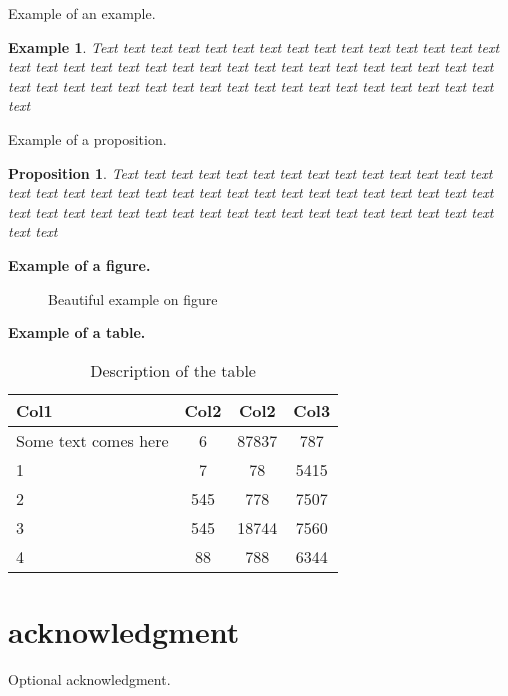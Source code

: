 \documentclass[12pt]{amsart}
\newtheorem{example}{Example}
\newtheorem{proposition}{Proposition}
\numberwithin{equation}{section}
\numberwithin{definition}{section}
\numberwithin{theorem}{section}
\numberwithin{lemma}{section}
\numberwithin{remark}{section}
\numberwithin{corollary}{section}
\numberwithin{proposition}{section}
\numberwithin{equation}{section}
\begin{document}
Example of an example.

\begin{example}\label{ex-1}
Text text text text text text text text text text text text text text text text text text text text text text text text text text text text text text text text text text text text text text text text text text text text text text text text text text text text
\end{example}


Example of a proposition.

\begin{proposition}\label{prop-1}
Text text text text text text text text text text text text text text text text text text text text text text text text text text text text text text text text text text text text text text text text text text text text text text text text text text text text
\end{proposition}

\textbf{Example of a figure.}
\begin{figure}[h!]
\centering
\caption{Beautiful example on figure}\label{fig-1}
\end{figure}


\textbf{Example of a table.}

\begin{table}[h!]
\centering
\caption{Description of the table}
\begin{tabular}{|p{2cm}| c c c|}
 \hline
 Col1 & Col2 & Col2 & Col3 \\ [0.5ex]
 \hline
 Some text comes here  & 6 & 87837 & 787 \\ \hline
 1 & 7 & 78 & 5415 \\ \hline
 2 & 545 & 778 & 7507 \\ \hline
 3 & 545 & 18744 & 7560 \\ \hline
 4 & 88 & 788 & 6344 \\ \hline
\end{tabular}
\label{table:1}
\end{table}




\vspace{5mm}
\section*{acknowledgment}
Optional acknowledgment.


\vspace{5mm}
\end{document}
